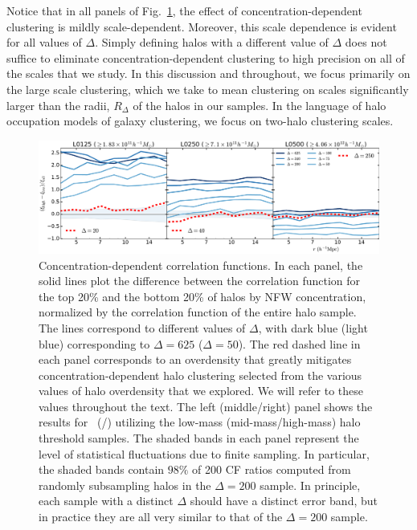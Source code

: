 \documentclass[usenatbib,fleqn]{mnras}
\begin{document}
Notice that in all panels of Fig.~\ref{fig:cc_cfcompare}, the effect of concentration-dependent clustering is mildly scale-dependent. Moreover, this scale dependence is evident for all values of $\Delta$. Simply defining halos with a different value of $\Delta$ does not suffice to eliminate concentration-dependent clustering to high precision on all of the scales that we study. In this discussion and throughout, we focus primarily on the large scale clustering, which we take to mean clustering on scales significantly larger than the radii, $R_{\Delta}$ of the halos in our samples. In the language of halo occupation models of galaxy clustering, we focus on two-halo clustering scales.

\begin{figure}
	\centering
	\includegraphics[width=\textwidth]{all_cfcompare_cnfw.pdf}
	\caption{
Concentration-dependent correlation functions. In each panel, the solid lines plot the difference between the correlation function for the top 20\% and the bottom 20\% of halos by NFW concentration, normalized by the correlation function of the entire halo sample. The lines correspond to different values of $\Delta$, with dark blue (light blue) corresponding to $\Delta = 625$ ($\Delta = 50$). The red dashed line in each panel  corresponds to an overdensity that greatly mitigates concentration-dependent halo clustering selected from the various values of halo overdensity that we explored. We will refer to these values throughout the text. The left (middle/right) panel shows the results for \simA \ (\simB /\simC) utilizing the low-mass (mid-mass/high-mass) halo threshold samples. The shaded bands in each panel represent the level of statistical fluctuations due to finite sampling. In particular, the shaded bands contain $98\%$ of 200 CF ratios computed from randomly subsampling halos in the $\Delta=200$ sample. In principle, each sample with a distinct $\Delta$ should have a distinct error band, but in practice they are all very similar to that of the $\Delta=200$ sample.
}
\label{fig:cc_cfcompare}
\end{figure}
\end{document}
